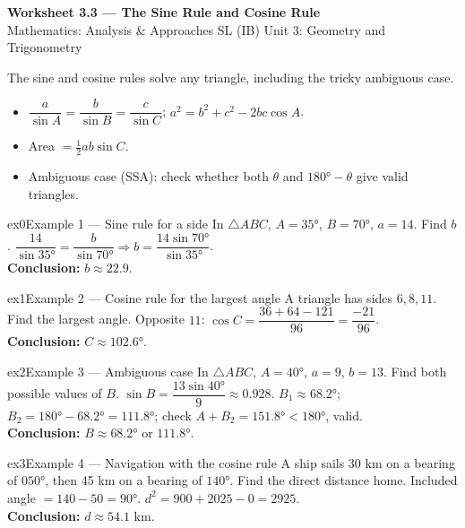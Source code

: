 \documentclass[11pt]{article}
\begin{document}
\begin{center}
{\LARGE\bfseries\color{titleblue}Worksheet 3.3 --- The Sine Rule and Cosine Rule}\\[2pt]
{\small Mathematics: Analysis \& Approaches SL (IB) \textperiodcentered{} Unit 3: Geometry and Trigonometry}
\end{center}

\begin{ideabox}
The sine and cosine rules solve any triangle, including the tricky ambiguous case.
\begin{itemize}[leftmargin=*,itemsep=2pt]
  \item $\dfrac{a}{\sin A}=\dfrac{b}{\sin B}=\dfrac{c}{\sin C}$; $a^2=b^2+c^2-2bc\cos A$.
  \item Area $=\tfrac12ab\sin C$.
  \item Ambiguous case (SSA): check whether both $\theta$ and $180°-\theta$ give valid triangles.
\end{itemize}
\end{ideabox}


\begin{example}{ex0}{Example 1 --- Sine rule for a side}
In $\triangle ABC$, $A=35°$, $B=70°$, $a=14$. Find $b$.\soln
$\dfrac{14}{\sin35°}=\dfrac{b}{\sin70°}\Rightarrow b=\dfrac{14\sin70°}{\sin35°}$.\\[3pt]\textbf{Conclusion:} $b\approx22.9$.
\end{example}

\begin{example}{ex1}{Example 2 --- Cosine rule for the largest angle}
A triangle has sides $6,8,11$. Find the largest angle.\soln
Opposite $11$: $\cos C=\dfrac{36+64-121}{96}=\dfrac{-21}{96}$.\\[3pt]\textbf{Conclusion:} $C\approx102.6°$.
\end{example}

\begin{example}{ex2}{Example 3 --- Ambiguous case}
In $\triangle ABC$, $A=40°$, $a=9$, $b=13$. Find both possible values of $B$.\soln
$\sin B=\dfrac{13\sin40°}{9}\approx0.928$. $B_1\approx68.2°$; $B_2=180°-68.2°=111.8°$; check $A+B_2=151.8°<180°$, valid.\\[3pt]\textbf{Conclusion:} $B\approx68.2°$ or $111.8°$.
\end{example}

\begin{example}{ex3}{Example 4 --- Navigation with the cosine rule}
A ship sails 30 km on a bearing of $050°$, then 45 km on a bearing of $140°$. Find the direct distance home.\soln
Included angle $=140-50=90°$. $d^2=900+2025-0=2925$.\\[3pt]\textbf{Conclusion:} $d\approx54.1$ km.
\end{example}
\end{document}
